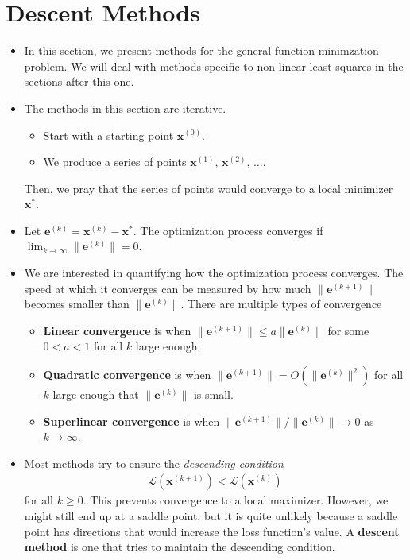 \documentclass[10pt]{article}
\newcommand{\ve}[1]{\mathbf{#1}}
\newcommand{\ra}{\rightarrow}
\newcommand{\mcal}[1]{\mathcal{#1}}
\begin{document}
\section{Descent Methods}

\begin{itemize}
    \item In this section, we present methods for the general function minimzation problem. We will deal with methods specific to non-linear least squares in the sections after this one.
    
    \item The methods in this section are iterative.
    \begin{itemize}
        \item Start with a starting point $\ve{x}^{(0)}$.
        \item We produce a series of points $\ve{x}^{(1)}$, $\ve{x}^{(2)}$, $\dotsc$.
    \end{itemize}
    Then, we pray that the series of points would converge to a local minimizer $\ve{x}^*$.

    \item Let $\ve{e}^{(k)} = \ve{x}^{(k)} - \ve{x}^*.$ The optimization process converges if $\lim_{k \ra \infty} \| \ve{e}^{(k)}\| = 0$.
    
    \item We are interested in quantifying how the optimization process converges. The speed at which it converges can be measured by how much $\| \ve{e}^{(k+1)} \|$ becomes smaller than $\| \ve{e}^{(k)} \|$. There are multiple types of convergence
    \begin{itemize}
        \item {\bf Linear convergence} is when $\| \ve{e}^{(k+1)}\| \leq a\| \ve{e}^{(k)} \|$ for some $0 < a < 1$ for all $k$ large enough.
        \item {\bf Quadratic convergence} is when $\| \ve{e}^{(k+1)}\| = O(\| \ve{e}^{(k)} \|^2)$ for all $k$ large enough that $\| \ve{e}^{(k)} \|$ is small.
        \item {\bf Superlinear convergence} is when $\| \ve{e}^{(k+1)}\| / \| \ve{e}^{(k)}\| \ra 0$ as $k \ra \infty$.
    \end{itemize}

    \item Most methods try to ensure the \emph{descending condition}
    \begin{align*}
        \mcal{L}(\ve{x}^{(k+1)}) < \mcal{L}(\ve{x}^{(k)})
    \end{align*}
    for all $k \geq 0$. This prevents convergence to a local maximizer. However, we might still end up at a saddle point, but it is quite unlikely because a saddle point has directions that would increase the loss function's value. A {\bf descent method} is one that tries to maintain the descending condition.


\end{itemize}
\end{document}
